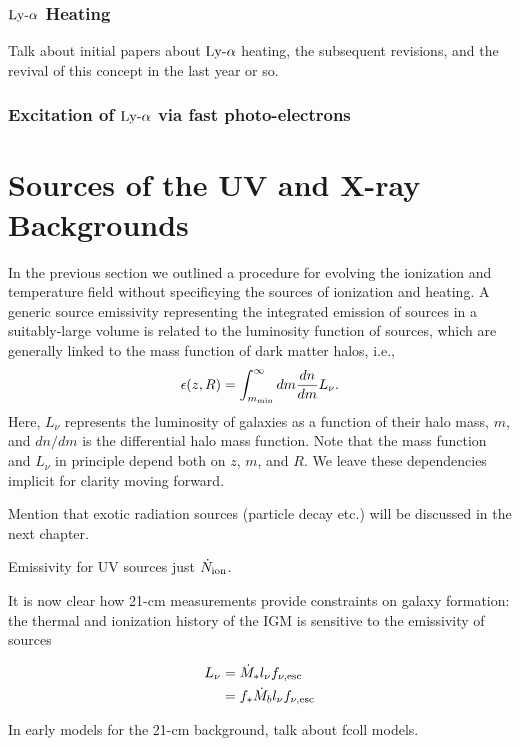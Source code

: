 \subsubsection{$\text{Ly-}\alpha$ Heating}
Talk about initial papers about $\text{Ly-}\alpha$ heating, the subsequent revisions, and the revival of this concept in the last year or so.


\subsubsection{Excitation of $\text{Ly-}\alpha$ via fast photo-electrons}

\section{Sources of the UV and X-ray Backgrounds} \label{sec:sources}
In the previous section we outlined a procedure for evolving the ionization and temperature field without specificying the sources of ionization and heating. A generic source emissivity representing the integrated emission of sources in a suitably-large volume is related to the luminosity function of sources, which are generally linked to the mass function of dark matter halos, i.e.,
\begin{equation}
	\epsilon(z,R) = \int_{m_{\text{min}}}^{\infty} dm \frac{dn}{dm} L_{\nu} .
\end{equation}
Here, $L_{\nu}$ represents the luminosity of galaxies as a function of their halo mass, $m$, and $dn/dm$ is the differential halo mass function. Note that the mass function and $L_{\nu}$ in principle depend both on $z$, $m$, and $R$. We leave these dependencies implicit for clarity moving forward.

{\color{red} Mention that exotic radiation sources (particle decay etc.) will be discussed in the next chapter.}

Emissivity for UV sources just $\dot{N}_{\text{ion}}$.



It is now clear how 21-cm measurements provide constraints on galaxy formation: the thermal and ionization history of the IGM is sensitive to the emissivity of sources

\begin{align}
	L_{\nu} & = \dot{M}_{\ast} l_{\nu} f_{\nu,\mathrm{esc}} \nonumber \\
	& = f_{\ast} \dot{M}_{b} l_{\nu} f_{\nu,\mathrm{esc}} \label{eq:LofM}
\end{align}


In early models for the 21-cm background, {\color{red} talk about fcoll models}.

